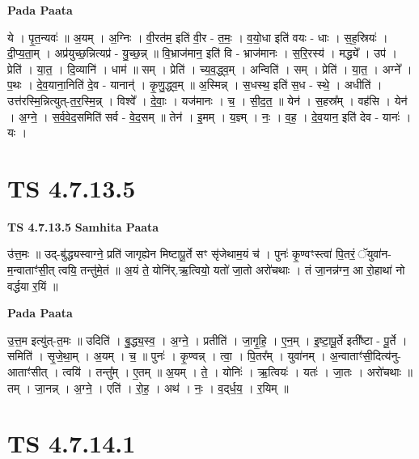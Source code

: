 \documentclass[17pt]{extarticle}
\begin{document}
\textbf{Pada Paata} \newline

ये । पृ॒त॒न्यवः॑ ॥ अ॒यम् । अ॒ग्निः । वी॒रत॑म॒ इति॑ वी॒र - त॒मः॒ । व॒यो॒धा इति॑ वयः - धाः । स॒ह॒स्रियः॑ । दी॒प्य॒ता॒म् । अप्र॑युच्छ॒न्नित्यप्र॑ - यु॒च्छ॒न्न् ॥ वि॒भ्राज॑मान॒ इति॑ वि - भ्राज॑मानः । स॒रि॒रस्य॑ । मद्ध्ये᳚ । उप॑ । प्रेति॑ । या॒त॒ । दि॒व्यानि॑ । धाम॑ ॥ सम् । प्रेति॑ । च्य॒व॒द्ध्व॒म् । अन्विति॑ । सम् । प्रेति॑ । या॒त॒ । अग्ने᳚ । प॒थः । दे॒व॒याना॒निति॑ दे॒व - यानान्॑ । कृ॒णु॒द्ध्व॒म् ॥ अ॒स्मिन्न् । स॒धस्थ॒ इति॑ स॒ध - स्थे॒ । अधीति॑ । उत्त॑रस्मि॒न्नित्युत्-त॒र॒स्मि॒न्न् । विश्वे᳚ । दे॒वाः॒ । यज॑मानः । च॒ । सी॒द॒त॒ ॥ येन॑ । स॒हस्र᳚म् । वह॑सि । येन॑ । अ॒ग्ने॒ । स॒र्व॒वे॒द॒समिति॑ सर्व - वे॒द॒सम् ॥ तेन॑ । इ॒मम् । य॒ज्ञ्म् । नः॒ । व॒ह॒ । दे॒व॒यान॒ इति॑ देव - यानः॑ । यः ।  \newline





\section{ TS 4.7.13.5 }

\textbf{TS 4.7.13.5 } \newline
\textbf{Samhita Paata} \newline

उ॑त्त॒मः ॥ उद्-बु॑द्ध्यस्वाग्ने॒ प्रति॑ जागृह्येन मिष्टापू॒र्ते सꣳ सृ॑जेथाम॒यं च॑ । पुनः॑ कृ॒ण्वꣳस्त्वा॑ पि॒तरं॒ ॅयुवा॑न-म॒न्वाताꣳ॑सी॒त् त्वयि॒ तन्तु॑मे॒तं ॥ अ॒यं ते॒ योनि॑र्.ऋ॒त्वियो॒ यतो॑ जा॒तो अरो॑चथाः । तं जा॒नन्न॑ग्न॒ आ रो॒हाथा॑ नो वर्द्धया र॒यिं ॥ \newline

\textbf{Pada Paata} \newline

उ॒त्त॒म इत्यु॑त्-त॒मः ॥ उदिति॑ । बु॒द्ध्य॒स्व॒ । अ॒ग्ने॒ । प्रतीति॑ । जा॒गृ॒हि॒ । ए॒न॒म् । इ॒ष्टा॒पू॒र्ते इती᳚ष्टा - पू॒र्ते । समिति॑ । सृ॒जे॒था॒म् । अ॒यम् । च॒ ॥ पुनः॑ । कृ॒ण्वन्न् । त्वा॒ । पि॒तर᳚म् । युवा॑नम् । अ॒न्वाताꣳ॑सी॒दित्य॑नु-आताꣳ॑सीत् । त्वयि॑ । तन्तु᳚म् । ए॒तम् ॥ अ॒यम् । ते॒ । योनिः॑ । ऋ॒त्वियः॑ । यतः॑ । जा॒तः । अरो॑चथाः ॥ तम् । जा॒नन्न् । अ॒ग्ने॒ । एति॑ । रो॒ह॒ । अथ॑ । नः॒ । व॒द्‌र्ध॒य॒ । र॒यिम् ॥  \newline





\section{ TS 4.7.14.1 }
\end{document}
